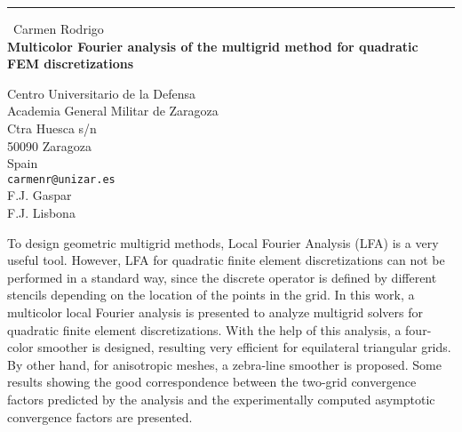 \documentclass{report}
\begin{document}
\begin{center}
\rule{6in}{1pt} \
{\large Carmen Rodrigo \\
{\bf Multicolor Fourier analysis of the multigrid method for quadratic FEM discretizations}}

Centro Universitario de la Defensa \\ Academia General Militar de Zaragoza \\ Ctra Huesca s/n \\ 50090 Zaragoza \\ Spain
\\
{\tt carmenr@unizar.es}\\
F.J. Gaspar\\
F.J. Lisbona\end{center}

To design geometric multigrid methods, Local Fourier Analysis (LFA) is a
very useful tool. However, LFA for quadratic finite element
discretizations can not be performed in a standard way, since the
discrete operator is defined by different stencils depending on the
location of the points in the grid. In this work, a multicolor local
Fourier analysis is presented to analyze multigrid solvers for quadratic
finite element discretizations. With the help of this analysis, a
four-color smoother is designed, resulting very efficient for equilateral
triangular grids. By other hand, for anisotropic meshes, a zebra-line
smoother is proposed. Some results showing the good correspondence
between the two-grid convergence factors predicted by the analysis and
the experimentally computed asymptotic convergence factors are presented.
\end{document}
